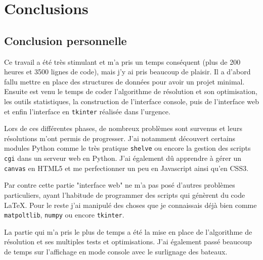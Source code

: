 \chapter{Conclusions}
\section{Conclusion personnelle}
Ce travail a été très stimulant et m'a pris un temps conséquent (plus de 200 heures et 3500 lignes de code), mais j'y ai pris beaucoup de plaisir. Il a d'abord fallu mettre en place des structures de données pour avoir un projet minimal. Ensuite est venu le temps de coder l'algorithme de résolution et son optimisation, les outils statistiques, la construction de l'interface console, puis de l'interface web et enfin l'interface en \texttt{tkinter} réalisée dans l'urgence. 

Lors de ces différentes phases, de nombreux problèmes sont survenus et leurs résolutions m'ont permis de progresser. J'ai notamment découvert certains modules Python comme le très pratique \texttt{shelve} ou encore la gestion des scripts \texttt{cgi} dans un serveur web en Python. J'ai également dû apprendre à gérer un \texttt{canvas} en HTML5 et me perfectionner un peu en Javascript ainsi qu'en CSS3. 

Par contre cette partie "interface web" ne m'a pas posé d'autres problèmes particuliers, ayant l'habitude de programmer des scripts qui génèrent du code \LaTeX. Pour le reste j'ai manipulé des choses que je connaissais déjà bien comme \texttt{matpoltlib}, \texttt{numpy} ou encore \texttt{tkinter}. 

La partie qui m'a pris le plus de temps a été la mise en place de l'algorithme de résolution et ses multiples tests et optimisations. J'ai également passé beaucoup de temps sur l'affichage en mode console avec le surlignage des bateaux.

%

